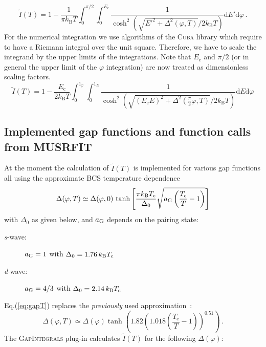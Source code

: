 \documentclass[twoside]{article}
\newcommand{\gapint}{\textsc{GapIntegrals}\xspace}
\begin{document}
\begin{equation}
\tilde{I}(T) = 1 - \frac{1}{\pi k_{\mathrm B}T}\int_0^{\pi/2}\int_{0}^{E_{\mathrm c}}\frac{1}{\cosh^2\left(\sqrt{E'^2+\Delta^2(\varphi,T)}/2k_{\mathrm B}T\right)}\mathrm{d}E'\mathrm{d}\varphi\,.
\end{equation}
For the numerical integration we use algorithms of the \textsc{Cuba} library \cite{cuba} which require to have a Riemann integral over the unit square. Therefore, we have to scale the integrand by the upper limits of the integrations. Note that $E_{\mathrm c}$ and $\pi/2$ (or in general the upper limit of the $\varphi$ integration) are now treated as dimensionless scaling factors.
\begin{equation}
\tilde{I}(T) =  1 - \frac{E_{\mathrm c}}{2k_{\mathrm B}T}\int_0^{1_{\varphi}}\int_{0}^{1_{E}}\frac{1}{\cosh^2\left(\sqrt{(E_{\mathrm c}E)^2+\Delta^2\left(\frac{\pi}{2}\varphi,T\right)}/2k_{\mathrm B}T\right)}\mathrm{d}E\mathrm{d}\varphi
\end{equation}

\subsection*{Implemented gap functions and function calls from MUSRFIT}
At the moment the calculation of $\tilde{I}(T)$ is implemented for various gap functions all using the approximate \textsc{BCS} temperature dependence~\cite{Prozorov}
\begin{equation}\label{eq:gapT}
 \Delta(\varphi,T) \simeq \Delta(\varphi,0)\,\tanh\left[\frac{\pi k_{\rm B} T_{\rm c}}{\Delta_0}\sqrt{a_{\rm G} \left(\frac{T_{\rm c}}{T}-1\right)}\right]
\end{equation}
\noindent with $\Delta_0$ as given below, and $a_{\rm G}$ depends on the pairing state:

\begin{description}
 \item [\textit{s}-wave:] $a_{\rm G}=1$ \qquad with $\Delta_0 = 1.76\, k_{\rm B} T_c$
 \item [\textit{d}-wave:] $a_{\rm G}=4/3$ \quad with $\Delta_0 = 2.14\, k_{\rm B} T_c$
\end{description}

\noindent Eq.(\ref{eq:gapT}) replaces the \emph{previously} used approximation~\cite{Manzano}:
\begin{equation}
\Delta(\varphi,T) \simeq \Delta(\varphi)\tanh\left(1.82\left(1.018\left(\frac{T_{\mathrm c}}{T}-1\right)\right)^{0.51}\right)\,.
\end{equation}
The \gapint plug-in calculates $\tilde{I}(T)$ for the following $\Delta(\varphi)$:
\end{document}
